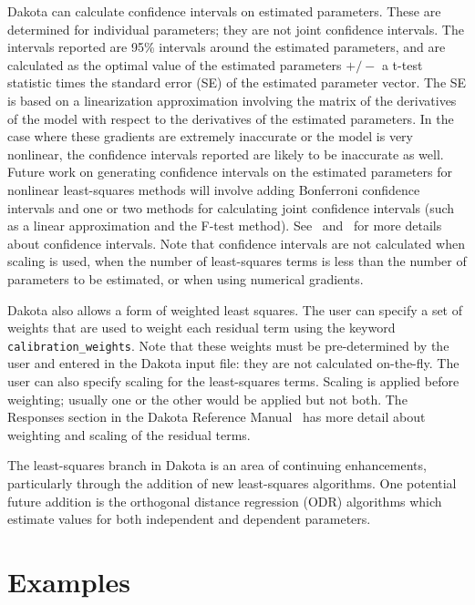 Dakota can calculate confidence intervals on estimated parameters.
These are determined for individual parameters; they are not joint
confidence intervals.  The intervals reported are 95\% intervals
around the estimated parameters, and are calculated as the optimal
value of the estimated parameters $+/-$ a t-test statistic times the
standard error (SE) of the estimated parameter vector.  The SE is
based on a linearization approximation involving the matrix of the
derivatives of the model with respect to the derivatives of the
estimated parameters.  In the case where these gradients are extremely
inaccurate or the model is very nonlinear, the confidence intervals
reported are likely to be inaccurate as well.  Future work on
generating confidence intervals on the estimated parameters for
nonlinear least-squares methods will involve adding Bonferroni
confidence intervals and one or two methods for calculating joint
confidence intervals (such as a linear approximation and the F-test
method). See~\cite{Seb03} and~\cite{Vug07} for more details about
confidence intervals. Note that confidence intervals are not
calculated when scaling is used, when the number of least-squares
terms is less than the number of parameters to be estimated, or when
using numerical gradients.

Dakota also allows a form of weighted least squares.  The user can
specify a set of weights that are used to weight each residual term
using the keyword \texttt{calibration\_weights}.  Note that these
weights must be pre-determined by the user and entered in the Dakota
input file: they are not calculated on-the-fly.  The user can also
specify scaling for the least-squares terms.  Scaling is applied
before weighting; usually one or the other would be applied but not
both.  The Responses section in the Dakota Reference
Manual~\cite{RefMan} has more detail about weighting and scaling of
the residual terms.

The least-squares branch in Dakota is an area of continuing
enhancements, particularly through the addition of new least-squares
algorithms. One potential future addition is the orthogonal distance
regression (ODR) algorithms which estimate values for both independent
and dependent parameters.

\section{Examples}\label{nls:examples}

